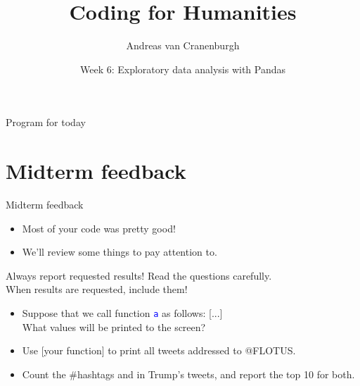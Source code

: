 \documentclass[aspectratio=169,usenames,dvipsnames]{beamer}
\title{Coding for Humanities}
\author{Andreas van Cranenburgh}
\date{Week 6: Exploratory data analysis with Pandas}
\begin{document}
\maketitle




\begin{frame}{Program for today}
\tableofcontents
\end{frame}


\section{Midterm feedback}

\begin{frame}{Midterm feedback}
    \begin{itemize}
        \item Most of your code was pretty good!
        \item We'll review some things to pay attention to.
    \end{itemize}
\end{frame}

\begin{frame}{Always report requested results!}
    Read the questions carefully. \\
    When results are requested, include them!

    \vspace{1em}
    \begin{itemize}
        \item Suppose that we call function \textcolor{blue}{\texttt{a}}
            as follows: [...]\\
            What values will be printed to the screen?
        \item Use [your function] to print all tweets addressed to @FLOTUS.
        \item Count the \#hashtags and \@usernames in Trump's tweets, and
            report the top 10 for both.
    \end{itemize}
\end{frame}
\end{document}
